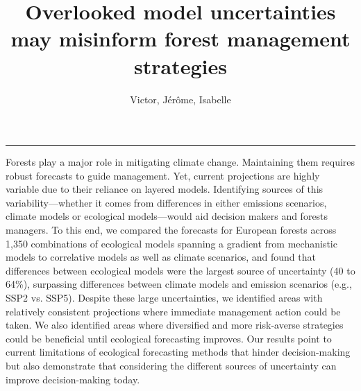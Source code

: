 \documentclass[11pt,letter]{article}
\begin{document}
\title{Overlooked model uncertainties may misinform forest management strategies
}

\author{Victor, Jérôme, Isabelle} %
\date{}
\maketitle 

\noindent\rule{\textwidth}{0.3pt}
Forests play a major role in mitigating climate change. Maintaining them requires robust forecasts to guide management. Yet, current projections are highly variable due to their reliance on layered models. Identifying sources of this variability---whether it comes from differences in either emissions scenarios, climate models or ecological models---would aid decision makers and forests managers. To this end, we compared the forecasts for European forests across 1,350 combinations of ecological models spanning a gradient from mechanistic models to correlative models as well as climate scenarios, and found that differences between ecological models were the largest source of uncertainty (40 to 64\%), surpassing differences between climate models and emission scenarios (e.g., SSP2 vs. SSP5). Despite these large uncertainties, we identified areas with relatively consistent projections where immediate management action could be taken. We also identified areas where diversified and more risk-averse strategies could be beneficial until ecological forecasting improves. Our results point to current limitations of ecological forecasting methods that hinder decision-making but also demonstrate that considering the different sources of uncertainty can improve decision-making today.
\end{document}
